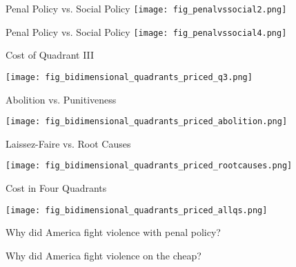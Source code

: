 \documentclass{beamer}
\begin{document}
\begin{frame}{Penal Policy vs. Social Policy}
    \texttt{[image: fig\_penalvssocial2.png]}
\end{frame}

\begin{frame}{Penal Policy vs. Social Policy}
    \texttt{[image: fig\_penalvssocial4.png]}
\end{frame}

\begin{frame}{Cost of Quadrant III}
\begin{center}
    \texttt{[image: fig\_bidimensional\_quadrants\_priced\_q3.png]}
\end{center}
\end{frame}

\begin{frame}{Abolition vs. Punitiveness}
\begin{center}
    \texttt{[image: fig\_bidimensional\_quadrants\_priced\_abolition.png]}
\end{center}
\end{frame}

\begin{frame}{Laissez-Faire vs. Root Causes}
\begin{center}
    \texttt{[image: fig\_bidimensional\_quadrants\_priced\_rootcauses.png]}
\end{center}
\end{frame}

\begin{frame}{Cost in Four Quadrants}
\begin{center}
    \texttt{[image: fig\_bidimensional\_quadrants\_priced\_allqs.png]}
\end{center}
\end{frame}

\begin{frame}{}
\begin{center}
    {\Large Why did America fight violence with penal policy?}
\end{center}
\end{frame}

\begin{frame}{}
\begin{center}
    {\Large \alert{Why did America fight violence on the cheap?}}
\end{center}
\end{frame}
\end{document}

